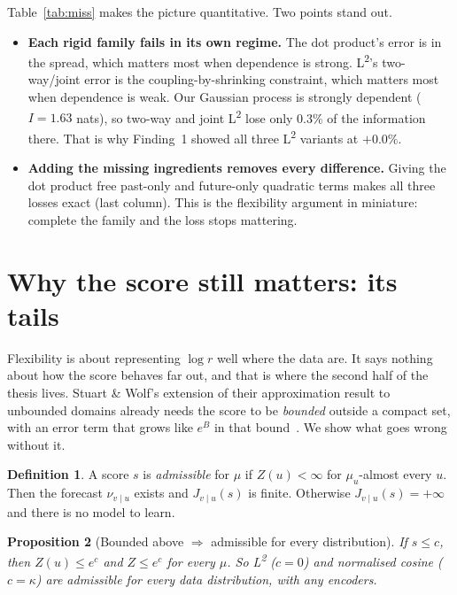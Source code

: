 \documentclass[11pt]{article}
\newcommand{\Ltwo}{L\textsuperscript{2}}
\newcommand{\vu}{{v\mid u}}
\theoremstyle{plain}
\newtheorem{proposition}{Proposition}
\theoremstyle{definition}
\newtheorem{definition}[proposition]{Definition}
\theoremstyle{remark}
\begin{document}
Table~\ref{tab:miss} makes the picture quantitative. Two points stand out.
\begin{itemize}
\item \textbf{Each rigid family fails in its own regime.} The dot product's error is in the
  spread, which matters most when dependence is strong. \Ltwo{}'s two-way/joint error is the
  coupling-by-shrinking constraint, which matters most when dependence is weak. Our Gaussian
  process is strongly dependent ($I=1.63$ nats), so two-way and joint \Ltwo{} lose only 0.3\% of
  the information there. That is why Finding~1 showed all three \Ltwo{} variants at $+0.0\%$.
\item \textbf{Adding the missing ingredients removes every difference.} Giving the dot product
  free past-only and future-only quadratic terms makes all three losses exact (last column).
  This is the flexibility argument in miniature: complete the family and the loss stops
  mattering.
\end{itemize}

\section{Why the score still matters: its tails}\label{sec:tails}

Flexibility is about representing $\log r$ well where the data are. It says nothing about how
the score behaves far out, and that is where the second half of the thesis lives. Stuart \&
Wolf's extension of their approximation result to unbounded domains already needs the score
to be \emph{bounded} outside a compact set, with an error term that grows like $e^{B}$ in
that bound~\cite{stuartwolf}. We show what goes wrong without it.

\begin{definition}
A score $s$ is \emph{admissible} for $\mu$ if $Z(u)<\infty$ for $\mu_u$-almost every $u$. Then
the forecast $\nu_\vu$ exists and $J_\vu(s)$ is finite. Otherwise $J_\vu(s)=+\infty$ and there is
no model to learn.
\end{definition}

\begin{proposition}[Bounded above $\Rightarrow$ admissible for every distribution]\label{prop:bounded}
If $s\le c$, then $Z(u)\le e^c$ and $Z\le e^c$ for every $\mu$. So \Ltwo{} ($c=0$) and
normalised cosine ($c=\kappa$) are admissible for every data distribution, with any encoders.
\end{proposition}
\end{document}
